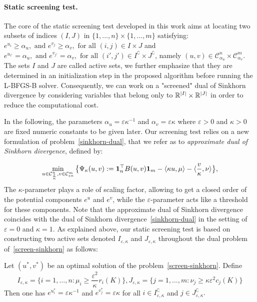 \paragraph{Static screening test.} The core of the static screening test developed in this work aims at locating two subsets of indices $(I, J)$ in $\{1, \ldots, n\}\times\{1, \ldots, m\}$ satisfying: $e^{u_i}\geq \alpha_u, \text{ and } e^{v_j}\geq \alpha_v, \text{ for all } (i,j) \in I \times J$ and 
$e^{u_{i'}} = \alpha_u, \text{ and } e^{v_{j'}} = \alpha_v, \text{ for all } (i',j') \in I^\complement \times J^\complement$, namely $(u,v) \in \mathcal{C}^n_{\alpha_u}\times \mathcal{C}^m_{\alpha_v}$.
The sets $I$ and $J$ are called active sets, we further emphasize that they are determined in an initialization step in the proposed algorithm before running the L-BFGS-B solver.
Consequently, we can work on a "screened" dual of Sinkhorn divergence by considering variables that belong only to ${\mathbb{R}}^{|I|} \times {\mathbb{R}}^{|J|}$ in order to reduce the computational cost.

In the following, the parameters $\alpha_u = \varepsilon \kappa^{-1}$ and $\alpha_v = \varepsilon \kappa$ where $\varepsilon > 0$ and $\kappa > 0$ are fixed numeric constants to be given later. 
Our screening test relies on a new formulation of problem~\eqref{sinkhorn-dual}, that we refer as to \emph{approximate dual of Sinkhorn divergence}, defined by:

\begin{equation} 
\label{screen-sinkhorn}
\min_{u \in \mathcal{C}^n_{\frac \varepsilon \kappa}, v\in \mathcal{C}^m_{\varepsilon\kappa}} \big\{\Psi_{\kappa}(u,v):= \mathbf{1}_n^\top B(u,v)\mathbf{1}_m - \langle \kappa u, \mu \rangle - \langle \frac v\kappa, \nu \rangle \big\},
\end{equation}
The $\kappa$-parameter plays a role of scaling factor, allowing to get a closed order of the potential components $e^u$ and $e^v$, while the $\varepsilon$-parameter acts like a threshold for these components.
Note that the approximate dual of Sinkhorn divergence coincides with the dual of Sinkhorn divergence~\eqref{sinkhorn-dual} in the setting of $\varepsilon=0$ and $\kappa=1$.
As explained above, our static screening test is based on constructing two {active sets} denoted $I_{\varepsilon, \kappa}$ and $J_{\varepsilon, \kappa}$ throughout the dual problem of~\eqref{screen-sinkhorn} as follows: 

\begin{lemma}
\label{lemma_actives_sets}
Let $(u^{*}, v^{*})$ be an optimal solution of the problem~\eqref{screen-sinkhorn}. 
Define
\begin{equation}
\label{I_epsilon_kappa_J_epsilon_kappa}
I_{\varepsilon,\kappa} = \big\{i=1, \ldots, n: \mu_i \geq \frac {\varepsilon^2} \kappa^{} r_i(K)\big\}, J_{\varepsilon,\kappa} = \big\{j=1, \ldots, m: \nu_j \geq \kappa{\varepsilon^2}{} c_j(K)\big\}
\end{equation}
Then one has $e^{u^{*}_i} = \varepsilon\kappa^{-1}$ and $e^{v^{*}_j} = \varepsilon\kappa$ for all $i \in I^\complement_{\varepsilon,\kappa} $ and $j\in J^\complement_{\varepsilon,\kappa} .$
\end{lemma}

